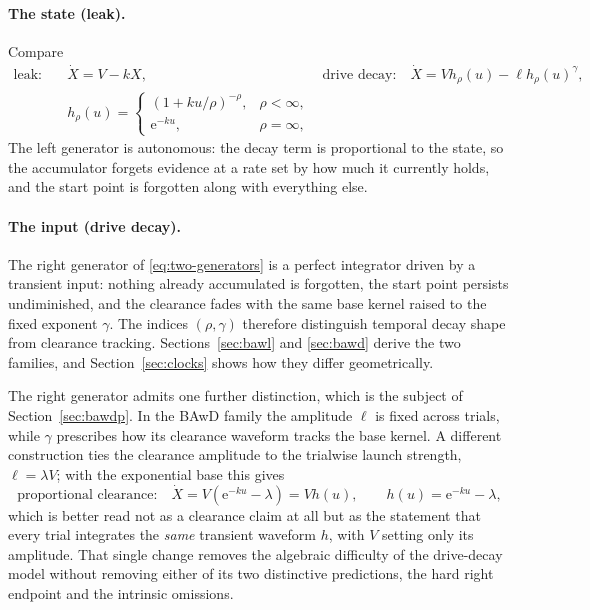 \documentclass[12pt]{article}
\newcommand{\e}{\mathrm{e}}
\theoremstyle{remark}
\begin{document}
\paragraph{The state (leak).} Compare
\begin{align}
 \text{leak:}\quad &\dot X = V-kX,
 &\text{drive decay:}\quad
 \dot X = Vh_\rho(u)-\ell h_\rho(u)^\gamma, \nonumber\\
 & h_\rho(u)=
 \begin{cases}
 (1+ku/\rho)^{-\rho},&\rho<\infty,\\
 \e^{-ku},&\rho=\infty,
 \end{cases}
 \label{eq:two-generators}
\end{align}
The left generator is autonomous: the decay term is proportional to the state, so the accumulator forgets evidence at a rate set by how much it currently holds, and the start point is forgotten along with everything else.

\paragraph{The input (drive decay).} The right generator of
\eqref{eq:two-generators} is a perfect integrator driven by a transient input:
nothing already accumulated is forgotten, the start point persists undiminished, and the clearance fades with the same base kernel raised to the fixed exponent $\gamma$. The indices $(\rho,\gamma)$ therefore distinguish temporal decay shape from clearance tracking. Sections~\ref{sec:bawl} and \ref{sec:bawd} derive the two families, and Section~\ref{sec:clocks} shows how they differ geometrically.

The right generator admits one further distinction, which is the subject of Section~\ref{sec:bawdp}. In the BAwD family the amplitude $\ell$ is fixed across trials, while $\gamma$ prescribes how its clearance waveform tracks the base kernel. A different construction ties the clearance amplitude to the trialwise launch strength, $\ell=\lambda V$; with the exponential base this gives
\begin{equation}
  \text{proportional clearance:}\quad
  \dot X = V\left(\e^{-ku} - \lambda\right)
         = V h(u),
  \qquad
  h(u) = \e^{-ku} - \lambda,
  \label{eq:bawdp-gen}
\end{equation}
which is better read not as a clearance claim at all but as the statement that every trial integrates the \emph{same} transient waveform $h$, with $V$ setting only its amplitude. That single change removes the algebraic difficulty of the drive-decay model without removing either of its two distinctive predictions, the hard right endpoint and the intrinsic omissions.
\end{document}
